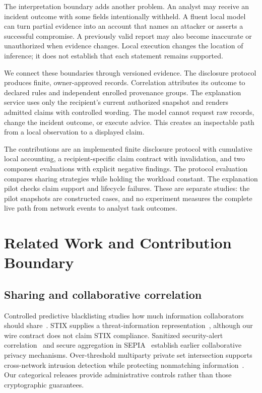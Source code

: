 \documentclass[conference,letterpaper]{IEEEtran}
\begin{document}
The interpretation boundary adds another problem. An analyst may receive an incident outcome with some fields intentionally withheld. A fluent local model can turn partial evidence into an account that names an attacker or asserts a successful compromise. A previously valid report may also become inaccurate or unauthorized when evidence changes. Local execution changes the location of inference; it does not establish that each statement remains supported.

We connect these boundaries through versioned evidence. The disclosure protocol produces finite, owner-approved records. Correlation attributes its outcome to declared rules and independent enrolled provenance groups. The explanation service uses only the recipient's current authorized snapshot and renders admitted claims with controlled wording. The model cannot request raw records, change the incident outcome, or execute advice. This creates an inspectable path from a local observation to a displayed claim.

The contributions are an implemented finite disclosure protocol with cumulative local accounting, a recipient-specific claim contract with invalidation, and two component evaluations with explicit negative findings. The protocol evaluation compares sharing strategies while holding the workload constant. The explanation pilot checks claim support and lifecycle failures. These are separate studies: the pilot snapshots are constructed cases, and no experiment measures the complete live path from network events to analyst task outcomes.

\section{Related Work and Contribution Boundary}
\subsection{Sharing and collaborative correlation}
Controlled predictive blacklisting studies how much information collaborators should share~\cite{freudiger}. STIX supplies a threat-information representation~\cite{stix}, although our wire contract does not claim STIX compliance. Sanitized security-alert correlation~\cite{lincoln} and secure aggregation in SEPIA~\cite{sepia} establish earlier collaborative privacy mechanisms. Over-threshold multiparty private set intersection supports cross-network intrusion detection while protecting nonmatching information~\cite{psi}. Our categorical releases provide administrative controls rather than those cryptographic guarantees.
\end{document}
